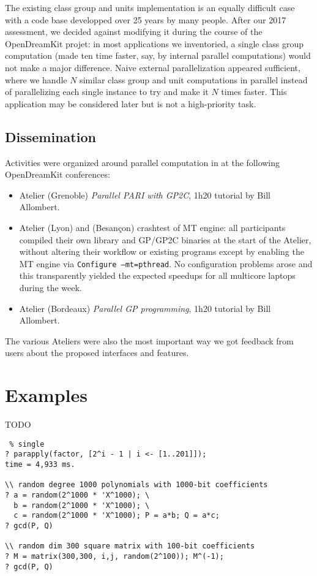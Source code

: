 \documentclass{deliverablereport}
\begin{document}
The existing class group and units implementation is an equally difficult
case with a code base developped over 25 years by many people. After our 2017
assessment, we decided against modifying it during the course of the
OpenDreamKit projet: in most applications we inventoried, a single class
group computation (made ten time faster, say, by internal parallel
computations) would not make a major difference. Naive external
parallelization appeared sufficient, where we handle $N$ similar class group 
and unit computations in parallel instead of parallelizing each single
instance to try and make it $N$ times faster. This application may be
considered later but is not a high-priority task.

\subsection{Dissemination}

Activities were organized around parallel computation in \PariGP
at the following OpenDreamKit conferences:
\begin{itemize}
  \item Atelier  (Grenoble) \emph{Parallel PARI with GP2C},
  1h20 tutorial by Bill Allombert.
  \item Atelier  (Lyon) and  (Besançon)
  crashtest of MT engine: all participants compiled their own \Pari library and
  GP/GP2C  binaries at the start of the Atelier, without altering their
  workflow or existing programs except by enabling the MT engine via
  \texttt{Configure --mt=pthread}. No configuration problems arose and this
  transparently yielded the expected speedups for all multicore laptops during
  the week.

  \item Atelier  (Bordeaux) \emph{Parallel GP programming},
  1h20 tutorial by Bill Allombert.
\end{itemize}
The various Ateliers were also the most important way we got feedback from
users about the proposed interfaces and features.


\section{Examples}
TODO

\begin{verbatim} % single
? parapply(factor, [2^i - 1 | i <- [1..201]]);
time = 4,933 ms.

\\ random degree 1000 polynomials with 1000-bit coefficients
? a = random(2^1000 * 'X^1000); \
  b = random(2^1000 * 'X^1000); \
  c = random(2^1000 * 'X^1000); P = a*b; Q = a*c;
? gcd(P, Q)

\\ random dim 300 square matrix with 100-bit coefficients
? M = matrix(300,300, i,j, random(2^100)); M^(-1);
? gcd(P, Q)
\end{verbatim}
\end{document}
